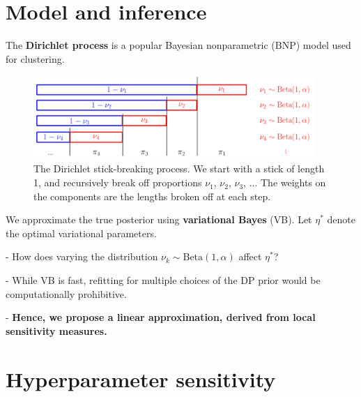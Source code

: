 \documentclass[a0,plainsections,30pt]{sciposter}\usepackage[]{graphicx}\usepackage[]{color}
\begin{document}
\begin{minipage}[t]{0.45\textwidth}
\section*{Model and inference }
\vspace{-0.3in}

The \textbf{Dirichlet process} is a popular Bayesian nonparametric
(BNP) model used for clustering.

\begin{figure}[!h]
\centering
\includegraphics[width = 0.95\textwidth]{./static_images/DP_stick_breaking.png}
\caption{The Dirichlet stick-breaking process. We start with a stick of
length 1, and recursively break off proportions $\nu_1$, $\nu_2$, $\nu_3$, ...
The weights on the components are the lengths broken off at each step.}
\setlength{\textfloatsep}{-10pt}
\end{figure}
%
We approximate the true posterior using \textbf{variational Bayes} (VB). Let $\eta^*$ denote the optimal variational parameters.
%
\begin{mdframed}[style=MyFrame]
- How does varying the distribution $\nu_k \sim \text{Beta}(1, \alpha)$ affect $\eta^*$?

- While VB is fast, refitting for multiple choices of the DP prior would be
computationally prohibitive.

- {\bf Hence, we propose a linear approximation, derived from local sensitivity measures. }
\end{mdframed}

\vspace{-0.6in}
\section*{Hyperparameter sensitivity}
\vspace{-0.3in}

\begin{itemize}


\end{itemize}
\end{minipage}
\end{document}
